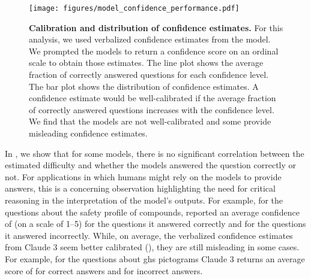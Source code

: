 \documentclass[11pt, oneside]{article}
\begin{document}
\begin{refsection}
 \begin{figure}[!h]
     \centering
     \texttt{[image: figures/model\_confidence\_performance.pdf]}
     \caption{\textbf{Calibration and distribution of confidence estimates.} For this analysis, we used verbalized confidence estimates from the model. We prompted the models to return a confidence score on an ordinal scale to obtain those estimates.
     The line plot shows the average fraction of correctly answered questions for each confidence level. The bar plot shows the distribution of confidence estimates. A confidence estimate would be well-calibrated if the average fraction of correctly answered questions increases with the confidence level.
     We find that the models are not well-calibrated and some provide misleading confidence estimates.
     }
     \label{fig:confidence_vs_performance}
 \end{figure}

 In , we show that for some models, there is no significant correlation between the estimated difficulty and whether the models answered the question correctly or not.
 For applications in which humans might rely on the models to provide answers, this is a concerning observation highlighting the need for critical reasoning in the interpretation of the model's outputs.\autocite{Li_2023, miret2024llms}
 For example, for the questions about the safety profile of compounds, \GPTFour reported an average confidence of  (on a scale of 1--5) for the  questions it answered correctly and  for the  questions it answered incorrectly.
 While, on average, the verbalized confidence estimates from Claude 3 seem better calibrated (), they are still misleading in some cases.
 For example, for the questions about \gls{ghs} pictograms Claude 3 returns an average score of  for correct answers and  for incorrect answers.


\end{refsection}
\end{document}

